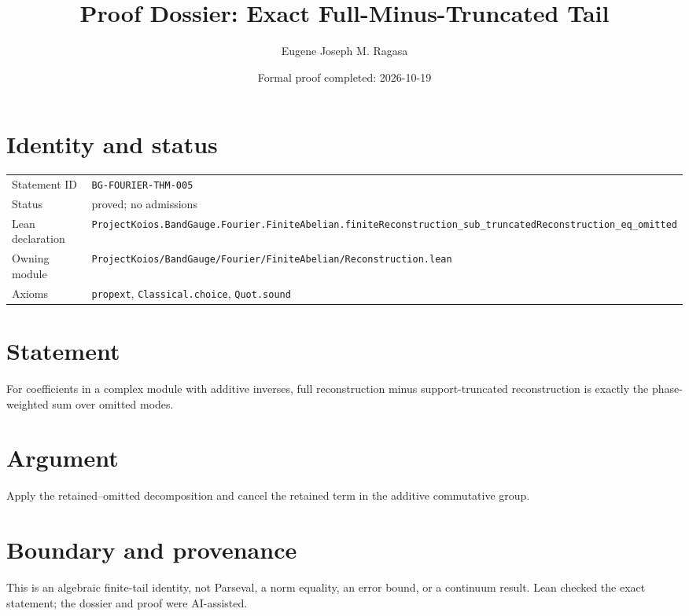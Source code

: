 \documentclass[11pt]{article}
\title{Proof Dossier: Exact Full-Minus-Truncated Tail}
\author{Eugene Joseph M. Ragasa}
\date{Formal proof completed: 2026-10-19}
\begin{document}
\maketitle
\section{Identity and status}
\begin{tabularx}{\textwidth}{@{}lX@{}}\toprule
Statement ID & \texttt{BG-FOURIER-THM-005} \\
Status & proved; no admissions \\
Lean declaration & \texttt{ProjectKoios.BandGauge.Fourier.FiniteAbelian.}\newline\texttt{finiteReconstruction\_sub\_truncatedReconstruction\_eq\_omitted} \\
Owning module & \texttt{ProjectKoios/BandGauge/Fourier/FiniteAbelian/Reconstruction.lean} \\
Axioms & \texttt{propext}, \texttt{Classical.choice}, \texttt{Quot.sound} \\
\bottomrule\end{tabularx}
\section{Statement}
For coefficients in a complex module with additive inverses, full reconstruction minus support-truncated reconstruction is exactly the phase-weighted sum over omitted modes.
\section{Argument}
Apply the retained--omitted decomposition and cancel the retained term in the additive commutative group.
\section{Boundary and provenance}
This is an algebraic finite-tail identity, not Parseval, a norm equality, an error bound, or a continuum result. Lean checked the exact statement; the dossier and proof were AI-assisted.
\end{document}

